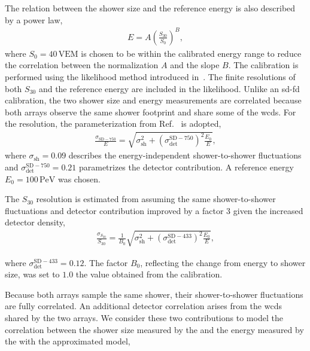 \documentclass[main.tex]{subfiles}
\begin{document}
{{{The relation between the  shower size and the  reference energy is also described by a power law,
\begin{align}
    E
    =
    A
    \left(
        \frac{S_{30}}{S_0}
    \right)^B,
    \label{eq:sd433_calibration}
\end{align}
where $S_0=40\,\mathrm{VEM}$ is chosen to be within the calibrated energy range to reduce the correlation between the normalization $A$ and the slope $B$.
The calibration is performed using the likelihood method introduced in~\cite{Dembinski:2016:Likelihood}.
The finite resolutions of both $S_{30}$ and the  reference energy are included in the likelihood.
Unlike an \gls{sd}-\gls{fd} calibration, the two shower size and energy measurements are correlated because both arrays observe the same shower footprint and share some of the \gls{wcd}s.
For the  resolution, the parameterization from Ref.~\cite{PierreAuger:2021:InfillSpectrum} is adopted,
\begin{align}
    \frac{\sigma_{\mathrm{SD-750}}}{E}
    =
    \sqrt{
        \sigma_{\mathrm{sh}}^2
        +
        \left(\sigma_{\mathrm{det}}^{\mathrm{SD-750}}\right)^2
        \frac{E_0}{E}
    },
\end{align}
where $\sigma_{\mathrm{sh}}=0.09$ describes the energy-independent shower-to-shower fluctuations and $\sigma_{\mathrm{det}}^{\mathrm{SD-750}}=0.21$ parametrizes the detector contribution. A reference energy $E_0=100\,\mathrm{PeV}$ was chosen.

The $S_{30}$ resolution is estimated from  assuming the same shower-to-shower fluctuations and detector contribution improved by a factor 3 given the increased detector density,
\begin{align}
    \frac{\sigma_{S_{30}}}{S_{30}}
    =
    \frac{1}{B_0}
    \sqrt{
        \sigma_{\mathrm{sh}}^2
        +
        \left(\sigma_{\mathrm{det}}^{\mathrm{SD-433}}\right)^2
        \frac{E_0}{E}
    },
\end{align}

where $\sigma_{\mathrm{det}}^{\mathrm{SD-433}}=0.12$. The factor $B_0$, reflecting the change from energy to shower size, was set to $1.0$ the value obtained from the calibration.  

Because both arrays sample the same shower, their shower-to-shower fluctuations are fully correlated.
An additional detector correlation arises from the \gls{wcd}s shared by the two arrays.
We consider these two contributions to model the correlation between the shower size measured by the  and the energy measured by the  with the approximated model, 

}}}
\end{document}
